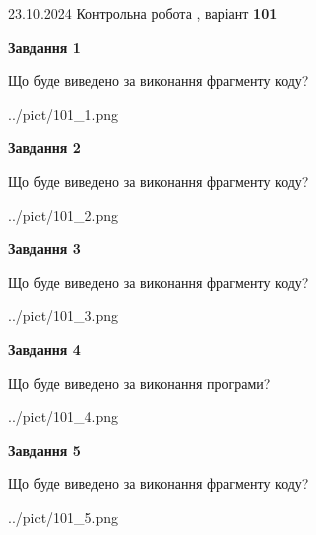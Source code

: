 \documentclass[12pt, ukrainian]{article}
\begin{document}
{\Large{23.10.2024 Контрольна робота , варіант  \No \textbf { 101 }\par}}
{
\begin {large}
{\begin {center}\textbf{Завдання 1}\end {center}}

Що буде виведено за виконання фрагменту коду?\par
\begin{center}
	{../pict/101_1.png}
\end{center}
\newpage

{\begin {center}\textbf{Завдання 2}\end {center}}

Що буде виведено за виконання фрагменту коду?\par
\begin{center}
	{../pict/101_2.png}
\end{center}
\newpage

{\begin {center}\textbf{Завдання 3}\end {center}}

Що буде виведено за виконання фрагменту коду?\par
\begin{center}
	{../pict/101_3.png}
\end{center}
\newpage

{\begin {center}\textbf{Завдання 4}\end {center}}

Що буде виведено за виконання програми?\par
\begin{center}
	{../pict/101_4.png}
\end{center}
\newpage

{\begin {center}\textbf{Завдання 5}\end {center}}

Що буде виведено за виконання фрагменту коду?\par
\begin{center}
	{../pict/101_5.png}
\end{center}
\newpage


\end{large}}
\end{document}

